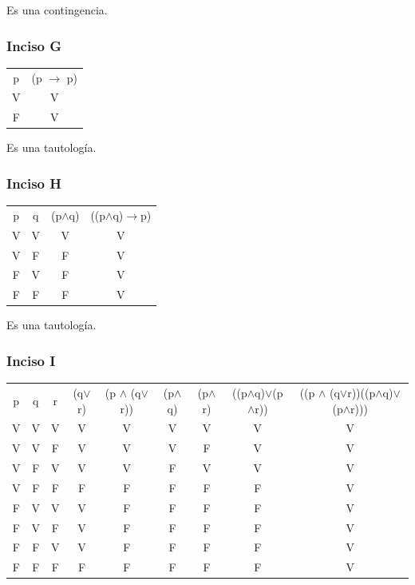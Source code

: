 	Es una contingencia.
	
	\subsubsection{Inciso G}
	\begin{tabular}{c|c}
		p & (p $\rightarrow$ p) \\
		V & V\\
		F & V
	\end{tabular}
	
	Es una tautología.
	
	\subsubsection{Inciso H}
	
	\begin{tabular}{c|c|c|c}
		p & q & (p$\wedge$q) & ((p$\wedge$q)$\rightarrow$p) \\
		V & V & V & V \\
		V & F & F & V \\
		F & V & F & V \\
		F & F & F & V \\
	\end{tabular}
	
	Es una tautología.
	
	\subsubsection{Inciso I}
	
	\begin{tabular}{c|c|c|c|c|c|c|c|c}
		p & q & r & (q$\vee$r) & (p $\wedge$ (q$\vee$r)) & (p$\wedge$q) & (p$\wedge$r) & ((p$\wedge$q)$\vee$(p$\wedge$r)) & ((p $\wedge$ (q$\vee$r))\Iff((p$\wedge$q)$\vee$(p$\wedge$r)))\\
		V & V & V & V & V & V & V & V & V \\
		V & V & F & V & V & V & F & V & V \\
		V & F & V & V & V & F & V & V & V \\
		V & F & F & F & F & F & F & F & V \\
		F & V & V & V & F & F & F & F & V \\
		F & V & F & V & F & F & F & F & V \\
		F & F & V & V & F & F & F & F & V \\
		F & F & F & F & F & F & F & F & V \\
	\end{tabular}
	
